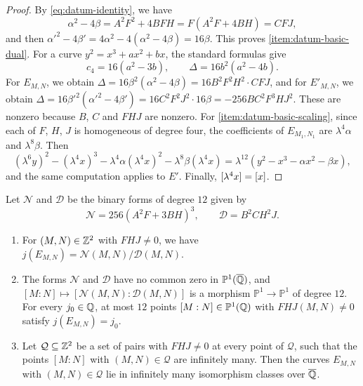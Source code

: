 \begin{proof}
By \eqref{eq:datum-identity}, we have
\begin{equation}
\alpha^2-4\beta=A^2F^2+4BFH=F(A^2F+4BH)=CFJ,
\end{equation}
and then $\alpha'^2-4\beta'=4\alpha^2-4(\alpha^2-4\beta)=16\beta$. This proves \ref{item:datum-basic-dual}. For a curve $y^2=x^3+ax^2+bx$, the standard formulas \cite[Section~III.1]{SilvermanAEC} give
\begin{equation}\label{eq:c4-Delta}
c_4=16(a^2-3b),\qquad\Delta=16b^2(a^2-4b).
\end{equation}
For $E_{M,N}$, we obtain $\Delta=16\beta^2(\alpha^2-4\beta)=16B^2F^2H^2\cdot CFJ$, and for $E'_{M,N}$, we obtain $\Delta=16\beta'^2(\alpha'^2-4\beta')=16C^2F^2J^2\cdot16\beta=-256BC^2F^3HJ^2$. These are nonzero because $B$, $C$ and $FHJ$ are nonzero. For \ref{item:datum-basic-scaling}, since each of $F$, $H$, $J$ is homogeneous of degree four, the coefficients of $E_{M_1,N_1}$ are $\lambda^4\alpha$ and $\lambda^8\beta$. Then
\begin{equation}
(\lambda^6y)^2-(\lambda^4x)^3-\lambda^4\alpha(\lambda^4x)^2-\lambda^8\beta(\lambda^4x)=\lambda^{12}(y^2-x^3-\alpha x^2-\beta x),
\end{equation}
and the same computation applies to $E'$. Finally, $[\lambda^4x]=[x]$.
\end{proof}

\begin{lemma}\label{lem:j-invariant}
Let $\mathcal N$ and $\mathcal D$ be the binary forms of degree $12$ given by
\begin{equation}\label{eq:j-forms}
\mathcal N=256(A^2F+3BH)^3,\qquad\mathcal D=B^2CH^2J.
\end{equation}
\begin{enumerate}[label=(\alph*),ref=(\alph*)]
\item\label{item:j-formula} For $(M,N)\in\mathbb Z^2$ with $FHJ\ne0$, we have $j(E_{M,N})=\mathcal N(M,N)/\mathcal D(M,N)$.
\item\label{item:j-degree} The forms $\mathcal N$ and $\mathcal D$ have no common zero in $\mathbb P^1(\overline{\mathbb Q})$, and $[M:N]\mapsto[\mathcal N(M,N):\mathcal D(M,N)]$ is a morphism $\mathbb P^1\to\mathbb P^1$ of degree $12$. For every $j_0\in\mathbb Q$, at most $12$ points $[M:N]\in\mathbb P^1(\mathbb Q)$ with $FHJ(M,N)\ne0$ satisfy $j(E_{M,N})=j_0$.
\item\label{item:j-infinite} Let $\mathcal Q\subseteq\mathbb Z^2$ be a set of pairs with $FHJ\ne0$ at every point of $\mathcal Q$, such that the points $[M:N]$ with $(M,N)\in\mathcal Q$ are infinitely many. Then the curves $E_{M,N}$ with $(M,N)\in\mathcal Q$ lie in infinitely many isomorphism classes over $\overline{\mathbb Q}$.
\end{enumerate}
\end{lemma}

